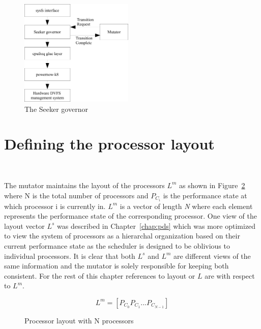 \begin{figure}[h!]
  \begin{center}
    \includegraphics[height=2in]{figures/seeker_governor.jpg}%
    \caption{The Seeker governor}
    \label{fig:governor}
  \end{center}
\end{figure}

\section{Defining the processor layout}~\label{sec:layout}

The mutator maintains the layout of the processors $L^m$ as shown in Figure~\ref{fig:mutator_layout_view}
where N is the total number of processors and 
$P_{C_{i}}$ is the performance state at which processor i is currently in. $L^m$
is a vector of length \textit{N} where each element represents the performance state
of the corresponding processor. 
One view of the layout vector $L^s$ was described in Chapter~\ref{chap:pds} 
which was more optimized to view the system of processors as a hierarchal organization
based on their current performance state as the scheduler is designed to be oblivious to individual processors. 
It is clear that both $L^s$ and $L^m$ are different views of the same information and 
the mutator is solely responsible for keeping both consistent. For the rest of this chapter
references to layout or $L$ are with respect to $L^m$. 

\begin{figure}[h!]
\centering
\begin{equation*}
    L^m = [ P_{C_{0}} P_{C_{1}} ... P_{C_{N-1}} ]
\end{equation*}
\caption{Processor layout with N processors}
\label{fig:mutator_layout_view}
\end{figure}


